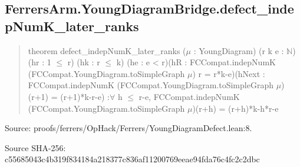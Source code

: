 \documentclass[11pt,a4paper]{article}
\begin{document}
\begin{samepage}
\subsection{FerrersArm.YoungDiagramBridge.defect\_indepNumK\_later\_ranks}
\begin{quote}\small\ttfamily theorem defect\_indepNumK\_later\_ranks (\ensuremath{\mu} : YoungDiagram) (r k e : \ensuremath{\mathbb{N}})\newline     (hr : 1 \ensuremath{\leq} r) (hk : r \ensuremath{\leq} k) (he : e < r)\newline     (hR : FCCompat.indepNumK (FCCompat.YoungDiagram.toSimpleGraph \ensuremath{\mu}) r = r*k-e)\newline     (hNext : FCCompat.indepNumK (FCCompat.YoungDiagram.toSimpleGraph \ensuremath{\mu})\newline       (r+1) = (r+1)*k-r-e) :\newline     \ensuremath{\forall} h \ensuremath{\leq} r-e, FCCompat.indepNumK (FCCompat.YoungDiagram.toSimpleGraph \ensuremath{\mu})\newline       (r+h) = (r+h)*k-h*r-e\end{quote}
{\small Source: proofs/ferrers/OpHack/Ferrers/YoungDiagramDefect.lean:8.\par}

{\small Source SHA-256: c55685043c4b319f834184a218377c836af11200769eeae94fda76c4fc2c2dbc\par}

\end{samepage}
\end{document}
